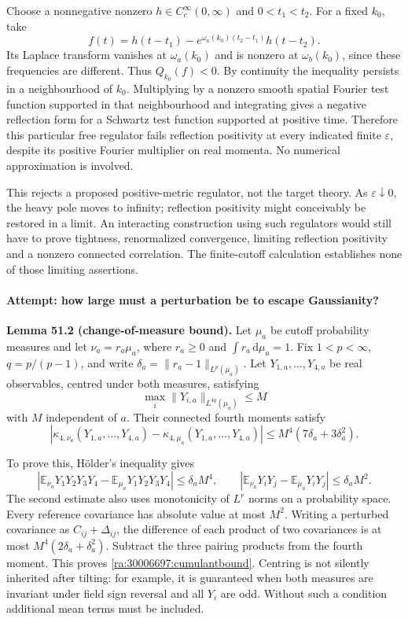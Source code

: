 \documentclass[11pt]{article}
\newcommand{\E}{\mathbb{E}}
\newcommand{\dd}{\,\mathrm d}
\begin{document}
Choose a nonnegative nonzero $h\in C_c^\infty(0,\infty)$ and $0<t_1<t_2$.
For a fixed $k_0$, take
\[
 f(t)=h(t-t_1)-e^{\omega_a(k_0)(t_2-t_1)}h(t-t_2).
\]
Its Laplace transform vanishes at $\omega_a(k_0)$ and is nonzero at
$\omega_b(k_0)$, since these frequencies are different. Thus
$Q_{k_0}(f)<0$. By continuity the inequality persists in a neighbourhood
of $k_0$. Multiplying by a nonzero smooth spatial Fourier test function
supported in that neighbourhood and integrating gives a negative
reflection form for a Schwartz test function supported at positive time.
Therefore this particular free regulator fails reflection positivity at
every indicated finite $\varepsilon$, despite its positive Fourier
multiplier on real momenta. No numerical approximation is involved.

This rejects a proposed positive-metric regulator, not the target theory.
As $\varepsilon\downarrow0$, the heavy pole moves to infinity; reflection
positivity might conceivably be restored in a limit. An interacting
construction using such regulators would still have to prove tightness,
renormalized convergence, limiting reflection positivity and a nonzero
connected correlation. The finite-cutoff calculation establishes none of
those limiting assertions.

\paragraph{Attempt: how large must a perturbation be to escape Gaussianity?}
\textbf{Lemma 51.2 (change-of-measure bound).} Let $\mu_a$ be cutoff
probability measures and let $\nu_a=r_a\mu_a$, where $r_a\ge0$ and
$\int r_a\dd\mu_a=1$. Fix $1<p<\infty$, $q=p/(p-1)$, and write
$\delta_a=\|r_a-1\|_{L^p(\mu_a)}$. Let $Y_{1,a},\ldots,Y_{4,a}$ be real
observables, centred under both measures, satisfying
\[
 \max_i\|Y_{i,a}\|_{L^{4q}(\mu_a)}\le M
\]
with $M$ independent of $a$. Their connected fourth moments satisfy
\begin{equation}\label{ra:30006697:cumulantbound}
 |\kappa_{4,\nu_a}(Y_{1,a},\ldots,Y_{4,a})
       -\kappa_{4,\mu_a}(Y_{1,a},\ldots,Y_{4,a})|
 \le M^4(7\delta_a+3\delta_a^2).
\end{equation}

To prove this, H\"older's inequality gives
\[
 |\E_{\nu_a}Y_1Y_2Y_3Y_4-\E_{\mu_a}Y_1Y_2Y_3Y_4|
 \le\delta_a M^4,
 \qquad
 |\E_{\nu_a}Y_iY_j-\E_{\mu_a}Y_iY_j|
 \le\delta_a M^2.
\]
The second estimate also uses monotonicity of $L^r$ norms on a probability
space. Every reference covariance has absolute value at most $M^2$.
Writing a perturbed covariance as $C_{ij}+\Delta_{ij}$, the difference of
each product of two covariances is at most
$M^4(2\delta_a+\delta_a^2)$. Subtract the three pairing products from the
fourth moment. This proves \eqref{ra:30006697:cumulantbound}. Centring is not
silently inherited after tilting: for example, it is guaranteed when both
measures are invariant under field sign reversal and all $Y_i$ are odd.
Without such a condition additional mean terms must be included.
\end{document}
